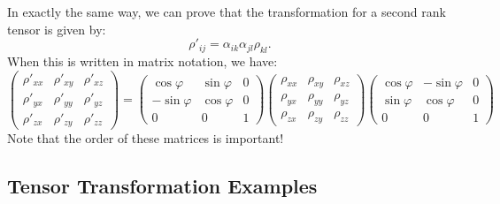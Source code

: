 In exactly the same way, we can prove that the transformation for a second rank tensor is given by:
\begin{equation}
	\rho'_{ij}	= \alpha_{ik}\alpha_{jl}\rho_{kl}.
\end{equation}
When this is written in matrix notation, we have:
\begin{equation}
	\left(\begin{array}{ccc}\rho'_{xx} & \rho'_{xy} & \rho'_{xz}\\
	\rho'_{yx}&\rho'_{yy}&\rho'_{yz}\\
	\rho'_{zx}&\rho'_{zy}&\rho'_{zz}\end{array}\right) =
	\left(\begin{array}{ccc}\cos\varphi & \sin\varphi & 0\\
	-\sin\varphi&\cos\varphi&0\\
	0&0&1\end{array}\right)
	\left(\begin{array}{ccc}\rho_{xx} & \rho_{xy} & \rho_{xz}\\
	\rho_{yx}&\rho_{yy}&\rho_{yz}\\
	\rho_{zx}&\rho_{zy}&\rho_{zz}\end{array}\right)
	\left(\begin{array}{ccc}\cos\varphi & -\sin\varphi & 0\\
	\sin\varphi&\cos\varphi&0\\
	0&0&1\end{array}\right)
\end{equation}
Note that the order of these matrices is important!  


\subsection{Tensor Transformation Examples}

